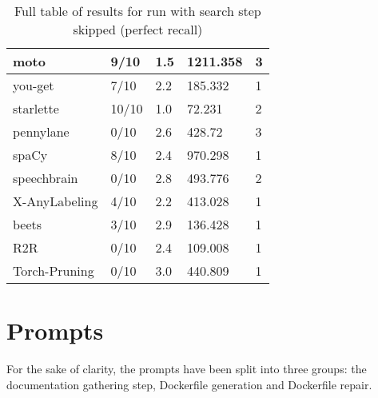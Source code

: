 \documentclass[conference]{IEEEtran}
\begin{document}
\begin{table}[!h]
\begin{tabular}{|l|l|l|l|l|}
        moto & 9/10 & 1.5 & 1211.358 & 3 \\ \hline
        you-get & 7/10 & 2.2 & 185.332 & 1 \\ \hline
        starlette & 10/10 & 1.0 & 72.231 & 2 \\ \hline
        pennylane & 0/10 & 2.6 & 428.72 & 3 \\ \hline
        spaCy & 8/10 & 2.4 & 970.298 & 1 \\ \hline
        speechbrain & 0/10 & 2.8 & 493.776 & 2 \\ \hline
        X-AnyLabeling & 4/10 & 2.2 & 413.028 & 1 \\ \hline
        beets & 3/10 & 2.9 & 136.428 & 1 \\ \hline
        R2R & 0/10 & 2.4 & 109.008 & 1 \\ \hline
        Torch-Pruning & 0/10 & 3.0 & 440.809 & 1 \\ \hline
    \end{tabular}
    \caption{Full table of results for run with search step skipped (perfect recall)}
    \label{tab:results}
\end{table}

\clearpage

\section{Prompts}
For the sake of clarity, the prompts have been split into three groups: the documentation gathering step, Dockerfile generation and Dockerfile repair.
\end{document}
